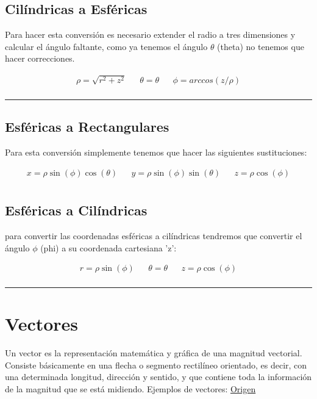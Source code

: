 \documentclass{article}
\begin{document}
\subsection{Cilíndricas a Esféricas}
\label{sec:org6556e76}
Para hacer esta conversión es necesario extender el radio a tres dimensiones y calcular el ángulo faltante, como ya tenemos el ángulo \(\theta\) (theta) no tenemos que hacer correcciones.

\[\begin{aligned}
 \rho = \sqrt{r^2+z^2} && 
 \theta = \theta  &&
 \phi = arccos\left( z/\rho \right) \\
\end{aligned}\] 

\noindent\rule{\textwidth}{0.5pt}

\subsection{Esféricas a Rectangulares}
\label{sec:org9f54fd0}
Para esta conversión simplemente tenemos que hacer las siguientes sustituciones:

\[\begin{aligned}
 x = \rho \sin(\phi)\cos(\theta) && 
 y = \rho \sin(\phi)\sin(\theta) &&
 z = \rho \cos(\phi) \\
\end{aligned}\] 

\subsection{Esféricas a Cilíndricas}
\label{sec:org3b61d3e}
para convertir las coordenadas esféricas a cilíndricas tendremos que convertir el ángulo \(\phi\) (phi) a su coordenada cartesiana 'z':

\[\begin{aligned}
 r = \rho \sin(\phi) && 
 \theta = \theta &&
 z = \rho \cos(\phi) \\
\end{aligned}\] 

\noindent\rule{\textwidth}{0.5pt}


\section{Vectores}
\label{sec:orgcdca16d}
Un vector es la representación matemática y gráfica de una magnitud vectorial. Consiste básicamente en una flecha o segmento rectilíneo orientado, es decir, con una determinada longitud, dirección y sentido, y que contiene toda la información de la magnitud que se está midiendo. Ejemplos de vectores:  \href{https://ingemecanica.com/tutoriales/calculo\_vectorial.html}{Origen}
\end{document}
